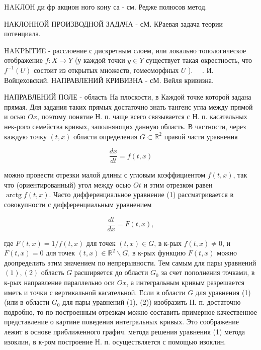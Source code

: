 \documentclass[10pt]{article}
\begin{document}
HAKЛОН ди фр акцион ного кону са - см. Редже полюсов метод.



НАКЛОННОЙ ПРОИЗВОДНОЙ ЗАДАЧА - сМ. КРаевая задача теории потенциала.



HAKPЫTИE - расслоение с дискретным слоем, или локально топологическое отображение $f: X \rightarrow Y$ (у каждой точки $y \in Y$ существует такая окрестность, что $f^{-1}(U)$ состоит из открытых множеств, гомеоморфных $U$ ). $\quad$. И. Войцеховский. НАПРАВЛЕНИЙ КРИВИЗНА - сМ. Вейля кривизна.



НАПРАВЛЕНИЙ ПОЛЕ - область На плоскости, в Каждой точке которой задана прямая. Для задания таких прямых достаточно знать тангенс угла между прямой и осью $O x$, поэтому понятие Н. п. чаще всего связывается с Н. п. касательных нек-рого семейства кривых, заполняющих данную область. В частности, через каждую точку $(t, x)$ области определения $G \subset \mathbb{R}^{2}$ правой части уравнения



\[

\frac{d x}{d t}=f(t, x)

\]



можно провести отрезки малой длины с угловым коэффициентом $f(t, x)$, так что (ориентированный) угол между осью $O t$ и этим отрезком равен $\operatorname{arctg} f(t, x)$. Часто дифференциальное уравнение (1) рассматривается в совокупности с дифференциальным уравнением



\[

\frac{d t}{d x}=F(t, x),

\]



где $F(t, x)=1 / f(t, x)$ для точек $(t, x) \in G$, в к-рых $f(t, x) \neq 0$, и $F(t, x)=0$ для точек $(t, x) \in \mathbb{R}^{2} \backslash G$, в к-рых функцию $F(t, x)$ можно доопределить этим значением по непрерывности. Тем самым для пары уравнений $(1),(2)$ область $G$ расширяется до области $G_{0}$ за счет пополнения точками, в к-рых направление параллельно оси $O x$, а интегральным кривым разрешается иметь и точки с вертикальной касательной. Если в области $G$ для уравнения (1) (или в области $G_{0}$ для пары уравнений (1), (2)) изобразить Н. п. достаточно подробно, то по построенным отрезкам можно составить примерное качественное представление о картине поведения интегральных кривых. Это соображение лежит в основе приближенного графич. метода решения уравнения (1) метода изоклин, в к-ром построение Н. п. осуществляется с помощью изоклин.
\end{document}
